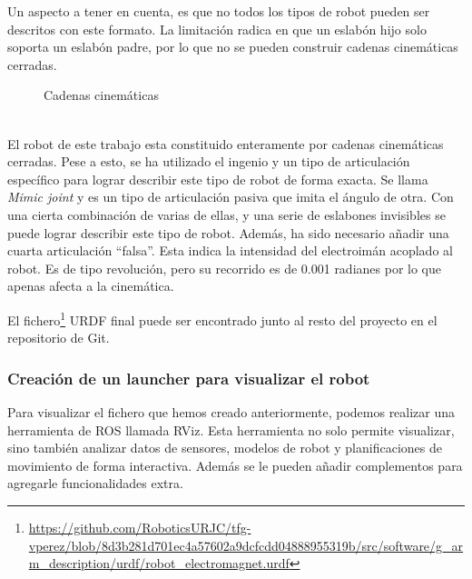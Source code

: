Un aspecto a tener en cuenta, es que no todos los tipos de robot pueden ser descritos con este formato. La limitación radica en que 
un eslabón hijo solo soporta un eslabón padre, por lo que no se pueden construir cadenas cinemáticas cerradas. \\
\begin{figure} [ht!]
    \centering  
    \hspace{2cm}
    \caption{Cadenas cinemáticas}
  \end{figure}\ 
\\
El robot de este trabajo esta constituido enteramente por cadenas cinemáticas cerradas. Pese a esto, se ha utilizado el ingenio y un tipo de 
articulación específico para lograr describir este tipo de robot de forma exacta. Se llama \textit{Mimic joint} y
es un tipo de articulación pasiva que imita el ángulo de otra. Con una cierta combinación de varias de ellas, y una serie de 
eslabones invisibles se puede lograr describir este tipo de robot. 
Además, ha sido necesario añadir una cuarta articulación \enquote{falsa}. Esta indica la intensidad del electroimán acoplado al robot. 
Es de tipo revolución, pero su recorrido es de 0.001 radianes por lo que apenas afecta a la cinemática. 

El fichero\footnote{\url{https://github.com/RoboticsURJC/tfg-vperez/blob/8d3b281d701ec4a57602a9dcfcdd04888955319b/src/software/g_arm_description/urdf/robot_electromagnet.urdf}} 
URDF final puede ser encontrado junto al resto del proyecto en el repositorio de Git.
\newpage
\subsubsection{Creación de un launcher para visualizar el robot}
\noindent Para visualizar el fichero que hemos creado anteriormente, podemos realizar una herramienta de ROS 
llamada RViz. Esta herramienta no solo permite visualizar, sino también analizar datos de sensores, modelos de robot y 
planificaciones de movimiento de forma interactiva. Además se le pueden añadir complementos para agregarle funcionalidades extra. 
\\

